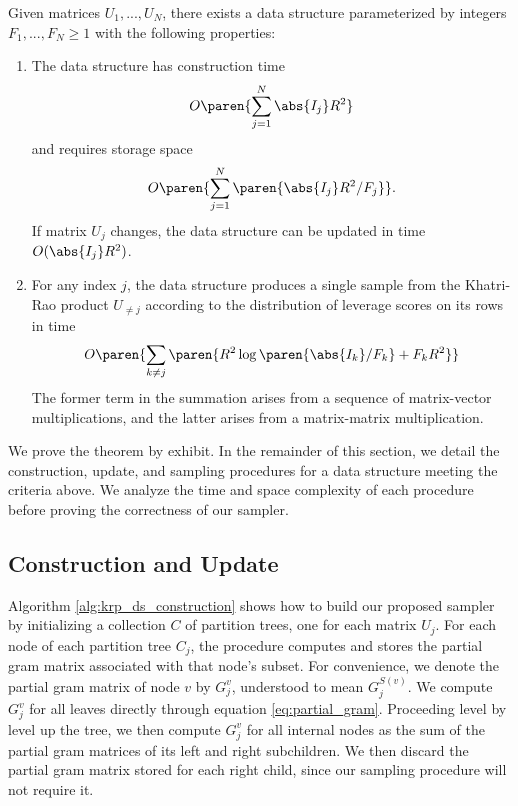 \begin{theorem}
Given matrices $U_1, ..., U_N$, there exists a data structure parameterized by integers $F_1, ..., F_N \geq 1$ with the following 
properties:
\begin{enumerate}
    \item The data structure has construction time 
    $$O\paren{\sum_{j=1}^N \abs{I_j} R^2}$$
    and requires storage space
    $$O\paren{\sum_{j=1}^N \paren{\abs{I_j} R^2 / F_j}}.$$
    If matrix $U_j$ changes, the data structure 
    can be updated in time $O(\abs{I_j} R^2)$.

    \item For any index $j$, the data structure produces a single sample from the Khatri-Rao product $U_{\neq j}$ according to the distribution of leverage scores on its rows in time
    $$O\paren{\sum_{k \neq j} \paren{R^2 \log \paren{\abs{I_k} / F_k} + F_k R^2}}$$
    The former term in the summation arises from a sequence of matrix-vector multiplications, and the latter
    arises from a matrix-matrix multiplication.  
\end{enumerate}
\label{thm:main_krp_res}
\end{theorem}
We prove the theorem by exhibit. In the remainder of this section,
we detail the construction, update, and sampling procedures for a data
structure meeting the criteria above. We analyze the time and
space complexity of each procedure before proving the correctness
of our sampler.

\subsection{Construction and Update}
Algorithm \ref{alg:krp_ds_construction} shows how
to build our proposed sampler by initializing a collection $C$ 
of partition trees, one for each matrix $U_j$. For each node 
of each partition tree $C_j$, the procedure computes and stores the partial gram matrix associated with that node's subset. 
For convenience, we denote the partial gram
matrix of node $v$ by $G_j^v$, understood to mean $G_j^{S(v)}$. 
We compute $G_j^v$ for all leaves directly through equation 
\ref{eq:partial_gram}. Proceeding level by level up the tree, we then
compute $G_j^{v}$ for all internal nodes as the sum of
the partial gram matrices of its left and right subchildren. We 
then discard the partial gram matrix stored for each right child,
since our sampling procedure will not require it.


